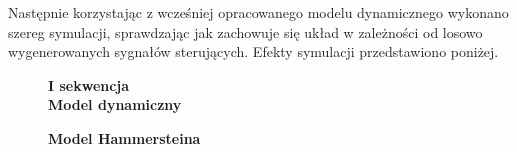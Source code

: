 Następnie korzystając z wcześniej opracowanego modelu dynamicznego wykonano szereg symulacji, sprawdzając jak zachowuje się układ w zależności od losowo wygenerowanych sygnałów sterujących. Efekty symulacji przedstawiono poniżej.


\begin{figure}[p!]

\begin{center}
\Large \textbf{I sekwencja} \\
\vspace{0.5cm}
\Large \textbf{Model dynamiczny}
\end{center}

\centering
{}
\hfill
{}

\begin{center}
\Large \textbf{Model Hammersteina}
\end{center}


\end{figure}
